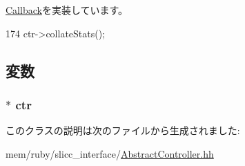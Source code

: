 \hyperlink{classCallback_a142b75b68a6291400e20fb0dd905b1c8}{Callback}を実装しています。


\begin{DoxyCode}
174 {ctr->collateStats();}
\end{DoxyCode}


\subsection{変数}
\hypertarget{classAbstractController_1_1StatsCallback_a888182eae55b1785e132b97c932bc5d4}{
\subsubsection[{ctr}]{$\ast$ {\bf ctr}}}
\label{classAbstractController_1_1StatsCallback_a888182eae55b1785e132b97c932bc5d4}


このクラスの説明は次のファイルから生成されました:\begin{DoxyCompactItemize}
\item 
mem/ruby/slicc\_\-interface/\hyperlink{AbstractController_8hh}{AbstractController.hh}\end{DoxyCompactItemize}

